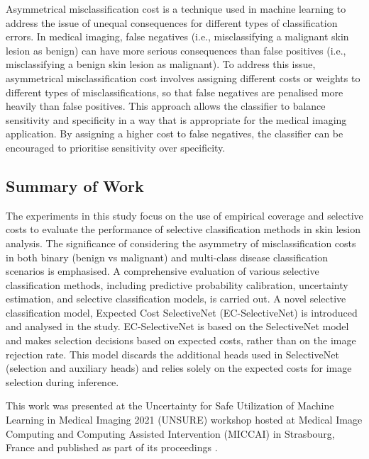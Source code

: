 Asymmetrical misclassification cost is a technique used in machine learning to address the issue of unequal consequences for different types of classification errors. In medical imaging, false negatives (i.e., misclassifying a malignant skin lesion as benign) can have more serious consequences than false positives (i.e., misclassifying a benign skin lesion as malignant). To address this issue, asymmetrical misclassification cost involves assigning different costs or weights to different types of misclassifications, so that false negatives are penalised more heavily than false positives. This approach allows the classifier to balance sensitivity and specificity in a way that is appropriate for the medical imaging application. By assigning a higher cost to false negatives, the classifier can be encouraged to prioritise sensitivity over specificity.

\subsection{Summary of Work}
\label{subsec:selective_summary_of_work}
The experiments in this study focus on the use of empirical coverage and selective costs to evaluate the performance of selective classification methods in skin lesion analysis. The significance of considering the asymmetry of misclassification costs in both binary (benign vs malignant) and multi-class disease classification scenarios is emphasised. A comprehensive evaluation of various selective classification methods, including predictive probability calibration, uncertainty estimation, and selective classification models, is carried out. A novel selective classification model, Expected Cost SelectiveNet (EC-SelectiveNet) is introduced and analysed in the study. EC-SelectiveNet is based on the SelectiveNet model~\cite{selective2019geifman} and makes selection decisions based on expected costs, rather than on the image rejection rate. This model discards the additional heads used in SelectiveNet (selection and auxiliary heads) and relies solely on the expected costs for image selection during inference.

This work was presented at the Uncertainty for Safe Utilization of Machine Learning in Medical Imaging 2021 (UNSURE) workshop hosted at Medical Image Computing and Computing Assisted Intervention (MICCAI) in Strasbourg, France and published as part of its proceedings \citep{carse2021robust}.



